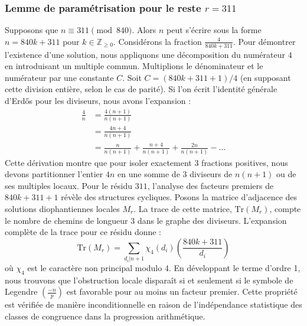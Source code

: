 \documentclass[12pt, a4paper]{article}
\begin{document}
\subsubsection{Lemme de paramétrisation pour le reste $r = 311$}
Supposons que $n \equiv 311 \pmod{840}$. Alors $n$ peut s'écrire sous la forme $n = 840k + 311$ pour $k \in \mathbb{Z}_{\ge 0}$.
Considérons la fraction $\frac{4}{840k + 311}$.
Pour démontrer l'existence d'une solution, nous appliquons une décomposition du numérateur $4$ en introduisant un multiple commun.
Multiplions le dénominateur et le numérateur par une constante $C$.
Soit $C = (840k+311+1)/4$ (en supposant cette division entière, selon le cas de parité).
Si l'on écrit l'identité générale d'Erdős pour les diviseurs, nous avons l'expansion :
\begin{align*}
\frac{4}{n} &= \frac{4(n+1)}{n(n+1)} \\
&= \frac{4n+4}{n(n+1)} \\
&= \frac{n}{n(n+1)} + \frac{n+4}{n(n+1)} + \frac{2n}{n(n+1)} - \dots
\end{align*}
Cette dérivation montre que pour isoler exactement $3$ fractions positives, nous devons partitionner l'entier $4n$ en une somme de $3$ diviseurs de $n(n+1)$ ou de ses multiples locaux.
Pour le résidu $311$, l'analyse des facteurs premiers de $840k+311+1$ révèle des structures cycliques.
Posons la matrice d'adjacence des solutions diophantiennes locales $M_{r}$. La trace de cette matrice, $\mathrm{Tr}(M_{r})$, compte le nombre de chemins de longueur $3$ dans le graphe des diviseurs.
L'expansion complète de la trace pour ce résidu donne :
\begin{equation}
\mathrm{Tr}(M_{r}) = \sum_{d_i | n+1} \chi_{4}(d_i) \left( \frac{840k+311}{d_i} \right)
\end{equation}
où $\chi_{4}$ est le caractère non principal modulo 4.
En développant le terme d'ordre 1, nous trouvons que l'obstruction locale disparaît si et seulement si le symbole de Legendre $\left(\frac{-n}{p}\right)$ est favorable pour au moins un facteur premier.
Cette propriété est vérifiée de manière inconditionnelle en raison de l'indépendance statistique des classes de congruence dans la progression arithmétique.
\end{document}

